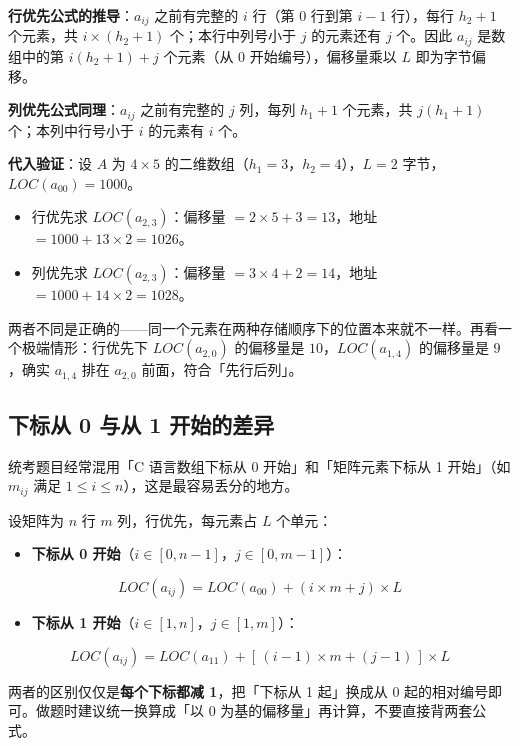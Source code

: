 \documentclass[11pt,openany,UTF8]{ctexbook}
\begin{document}
\textbf{行优先公式的推导}：$a_{ij}$ 之前有完整的 $i$ 行（第 $0$ 行到第 $i-1$ 行），每行 $h_2+1$ 个元素，共 $i \times (h_2+1)$ 个；本行中列号小于 $j$ 的元素还有 $j$ 个。因此 $a_{ij}$ 是数组中的第 $i(h_2+1)+j$ 个元素（从 0 开始编号），偏移量乘以 $L$ 即为字节偏移。

\textbf{列优先公式同理}：$a_{ij}$ 之前有完整的 $j$ 列，每列 $h_1+1$ 个元素，共 $j(h_1+1)$ 个；本列中行号小于 $i$ 的元素有 $i$ 个。

\textbf{代入验证}：设 $A$ 为 $4 \times 5$ 的二维数组（$h_1 = 3$，$h_2 = 4$），$L = 2$ 字节，$LOC(a_{00}) = 1000$。

\begin{itemize}
\item 行优先求 $LOC(a_{2,3})$：偏移量 $= 2 \times 5 + 3 = 13$，地址 $= 1000 + 13 \times 2 = 1026$。
\item 列优先求 $LOC(a_{2,3})$：偏移量 $= 3 \times 4 + 2 = 14$，地址 $= 1000 + 14 \times 2 = 1028$。
\end{itemize}
两者不同是正确的——同一个元素在两种存储顺序下的位置本来就不一样。再看一个极端情形：行优先下 $LOC(a_{2,0})$ 的偏移量是 $10$，$LOC(a_{1,4})$ 的偏移量是 $9$，确实 $a_{1,4}$ 排在 $a_{2,0}$ 前面，符合「先行后列」。

\subsection{下标从 0 与从 1 开始的差异}

统考题目经常混用「C 语言数组下标从 0 开始」和「矩阵元素下标从 1 开始」（如 $m_{ij}$ 满足 $1 \le i \le n$），这是最容易丢分的地方。

设矩阵为 $n$ 行 $m$ 列，行优先，每元素占 $L$ 个单元：

\begin{itemize}
\item \textbf{下标从 0 开始}（$i \in [0, n-1]$，$j \in [0, m-1]$）：
\end{itemize}
\[LOC(a_{ij}) = LOC(a_{00}) + (i \times m + j) \times L\]

\begin{itemize}
\item \textbf{下标从 1 开始}（$i \in [1, n]$，$j \in [1, m]$）：
\end{itemize}
\[LOC(a_{ij}) = LOC(a_{11}) + \left[\,(i-1) \times m + (j-1)\,\right] \times L\]

两者的区别仅仅是\textbf{每个下标都减 1}，把「下标从 1 起」换成从 0 起的相对编号即可。做题时建议统一换算成「以 0 为基的偏移量」再计算，不要直接背两套公式。
\end{document}
